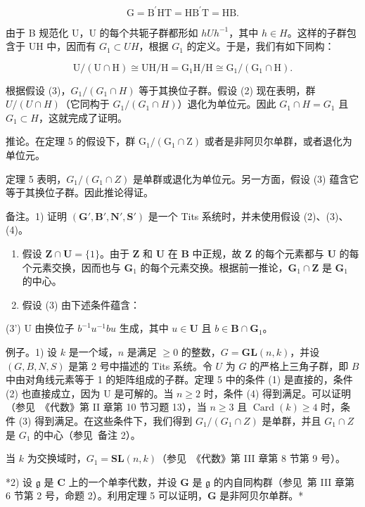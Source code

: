 \[
\mathrm{G} = \mathrm{B} ^ {\prime} \mathrm{HT} = \mathrm{HB} ^ {\prime} \mathrm{T} = \mathrm{HB}.
\]

由于 B 规范化 U，U 的每个共轭子群都形如 \(hUh^{-1}\)，其中 \(h \in H\)。这样的子群包含于 UH 中，因而有 \(G_{1} \subset UH\)，根据 \(G_{1}\) 的定义。于是，我们有如下同构：

\[
\mathrm{U} / (\mathrm{U} \cap \mathrm{H}) \cong \mathrm{UH} / \mathrm{H} = \mathrm{G} _ {1} \mathrm{H} / \mathrm{H} \cong \mathrm{G} _ {1} / (\mathrm{G} _ {1} \cap \mathrm{H}).
\]

根据假设 (3)，\(G_{1}/(G_{1} \cap H)\) 等于其换位子群。假设 (2) 现在表明，群 \(U/(U \cap H)\)（它同构于 \(G_{1}/(G_{1} \cap H)\)）退化为单位元。因此 \(G_{1} \cap H = G_{1}\) 且 \(G_{1} \subset H\)，这就完成了证明。

推论。在定理 5 的假设下，群 \(\mathrm{G}_{1}/(\mathrm{G}_{1} \cap \mathrm{Z})\) 或者是非阿贝尔单群，或者退化为单位元。

定理 5 表明，\(G_{1}/(G_{1} \cap Z)\) 是单群或退化为单位元。另一方面，假设 (3) 蕴含它等于其换位子群。因此推论得证。

备注。1) 证明 \((\mathbf{G}', \mathbf{B}', \mathbf{N}', \mathbf{S}')\) 是一个 Tits 系统时，并未使用假设 (2)、(3)、(4)。

\begin{enumerate}
\def\labelenumi{\arabic{enumi})}
\setcounter{enumi}{1}
\item
  假设 \(\mathbf{Z} \cap \mathbf{U} = \{1\}\)。由于 \(\mathbf{Z}\) 和 \(\mathbf{U}\) 在 \(\mathbf{B}\) 中正规，故 \(\mathbf{Z}\) 的每个元素都与 \(\mathbf{U}\) 的每个元素交换，因而也与 \(\mathbf{G}_1\) 的每个元素交换。根据前一推论，\(\mathbf{G}_1 \cap \mathbf{Z}\) 是 \(\mathbf{G}_1\) 的中心。
\item
  假设 (3) 由下述条件蕴含：
\end{enumerate}

(3') U 由换位子 \(b^{-1}u^{-1}bu\) 生成，其中 \(u \in \mathbf{U}\) 且 \(b \in \mathbf{B} \cap \mathbf{G}_1\)。

例子。1) 设 \(k\) 是一个域，\(n\) 是满足 \(\geqslant 0\) 的整数，\(G = \mathbf{GL}(n, k)\)，并设 \((G, B, N, S)\) 是第 2 号中描述的 Tits 系统。令 \(U\) 为 \(G\) 的严格上三角子群，即 \(B\) 中由对角线元素等于 1 的矩阵组成的子群。定理 5 中的条件 (1) 是直接的，条件 (2) 也直接成立，因为 U 是可解的。当 \(n \geqslant 2\) 时，条件 (4) 得到满足。可以证明（参见~《代数》第 II 章第 10 节习题 13），当 \(n \geqslant 3\) 且 \(\operatorname{Card}(k) \geqslant 4\) 时，条件 (3) 得到满足。在这些条件下，我们得到 \(G_{1}/(G_{1} \cap Z)\) 是单群，并且 \(G_{1} \cap Z\) 是 \(G_{1}\) 的中心（参见~备注 2）。

当 \(k\) 为交换域时，\(G_1 = \mathbf{SL}(n,k)\)（参见~《代数》第 III 章第 8 节第 9 号）。

*2) 设 \(\mathfrak{g}\) 是 \(\mathbf{C}\) 上的一个单李代数，并设 \(\mathbf{G}\) 是 \(\mathfrak{g}\) 的内自同构群（参见~第 III 章第 6 节第 2 号，命题 2）。利用定理 5 可以证明，\(\mathbf{G}\) 是非阿贝尔单群。*

